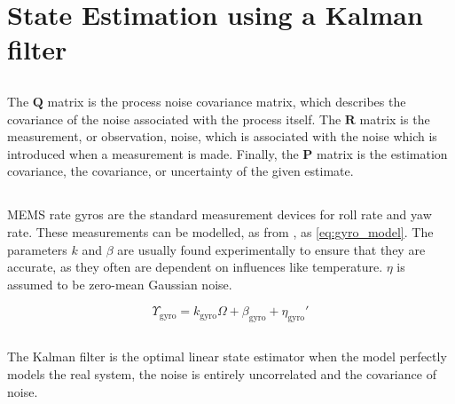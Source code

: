 \section{State Estimation using a Kalman filter}

\subsection{} %
The $\mathbf{Q}$ matrix is the process noise covariance matrix, which describes the covariance of the noise associated with the process itself.  The $\mathbf{R}$ matrix is the measurement, or observation, noise, which is associated with the noise which is introduced when a measurement is made. Finally, the $\mathbf{P}$ matrix is the estimation covariance, the covariance, or uncertainty of the given estimate.


\subsection{} %
MEMS rate gyros are the standard measurement devices for roll rate and yaw rate. These measurements can be modelled, as from \cite[p. 125]{beard_mclain_2012}, as \eqref{eq:gyro_model}. The parameters $k$ and $\beta$ are usually found experimentally to ensure that they are accurate, as they often are dependent on influences like temperature. $\eta$ is assumed to be zero-mean Gaussian noise. 

\begin{equation}
    \label{eq:gyro_model}
    \Upsilon_{\text{gyro}} = k_{\text{gyro}} \Omega + \beta_{\text{gyro}} + \eta_{\text{gyro}}'
\end{equation}





\subsection{} %
The Kalman filter is the optimal linear state estimator when the model perfectly models the real system, the noise is entirely uncorrelated and the covariance of noise. 


\subsection{} %


